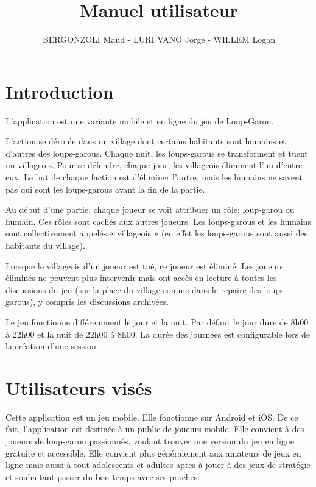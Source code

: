 \documentclass[10pt]{article}
\title{Manuel utilisateur}
\author{BERGONZOLI Maud - LURI VANO Jorge - WILLEM Logan}
\date{}
\begin{document}
\maketitle
\tableofcontents

\newpage

\section{Introduction}

L'application est une variante mobile et en ligne du jeu de Loup-Garou.

L’action se déroule dans un village dont certains habitants sont humains et d’autres des loups-garous. Chaque nuit, les loups-garous se transforment et tuent un villageois. Pour se défendre, chaque jour, les villageois éliminent l’un d’entre eux. Le but de chaque faction est d’éliminer l’autre, mais les humains ne savent pas qui sont les loups-garous avant la fin de la partie.

Au début d’une partie, chaque joueur se voit attribuer un rôle: loup-garou ou humain. Ces rôles sont cachés aux autres joueurs. Les loups-garous et les humains sont collectivement appelés « villageois » (en effet les loups-garous sont aussi des habitants du village).

Lorsque le villageois d’un joueur est tué, ce joueur est éliminé. Les joueurs éliminés ne peuvent plus intervenir mais ont accès en lecture à toutes les discussions du jeu (sur la place du village comme dans le repaire des loups-garous), y compris les discussions archivées.

Le jeu fonctionne différemment le jour et la nuit. Par défaut le jour dure de 8h00 à 22h00 et la nuit de 22h00 à 8h00. La durée des journées est configurable lors de la création d'une session.



\section{Utilisateurs visés}

Cette application est un jeu mobile. Elle fonctionne sur Android et iOS.
De ce fait, l'application est destinée à un public de joueurs mobile.
Elle convient à des joueurs de loup-garou passionnés, voulant trouver une version du jeu en ligne gratuite et accessible. Elle convient plus généralement aux amateurs de jeux en ligne mais aussi à tout adolescents et adultes aptes à jouer à des jeux de stratégie et souhaitant passer du bon temps avec ses proches.
\end{document}
